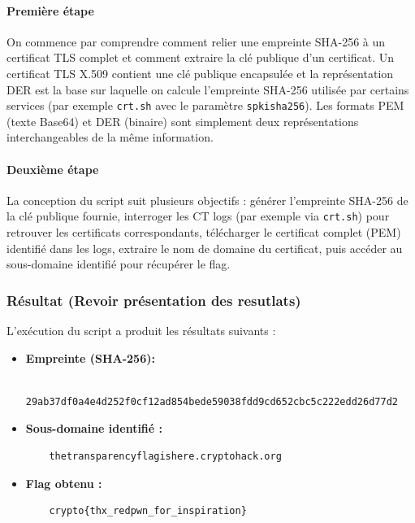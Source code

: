 \paragraph{Première étape} On commence par comprendre comment relier une
empreinte SHA-256 à un certificat TLS complet et comment extraire la clé
publique d'un certificat. Un certificat TLS X.509 contient une clé
publique encapsulée et la représentation DER est la base sur laquelle on
calcule l'empreinte SHA-256 utilisée par certains services (par exemple
\texttt{crt.sh} avec le paramètre \texttt{spkisha256}). Les formats PEM
(texte Base64) et DER (binaire) sont simplement deux représentations
interchangeables de la même information.

\paragraph{Deuxième étape} La conception du script suit plusieurs
objectifs : générer l'empreinte SHA-256 de la clé publique fournie,
interroger les CT logs (par exemple via \texttt{crt.sh}) pour retrouver
les certificats correspondants, télécharger le certificat complet (PEM)
identifié dans les logs, extraire le nom de domaine du certificat,
puis accéder au sous-domaine identifié pour récupérer le flag.

\subsubsection{Résultat (Revoir présentation des resutlats)}
L'exécution du script a produit les résultats suivants :
\begin{itemize}
    \item \textbf{Empreinte (SHA-256):}
    \begin{verbatim}
    29ab37df0a4e4d252f0cf12ad854bede59038fdd9cd652cbc5c222edd26d77d2
    \end{verbatim}
    \item \textbf{Sous-domaine identifié :}
    \begin{verbatim}
    thetransparencyflagishere.cryptohack.org
    \end{verbatim}
    \item \textbf{Flag obtenu :}
    \begin{verbatim}
    crypto{thx_redpwn_for_inspiration}
    \end{verbatim}
\end{itemize}